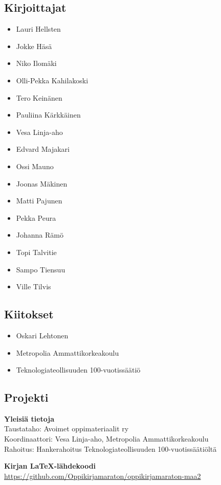 \newpage
\subsection*{Kirjoittajat}
\begin{itemize}
\item Lauri Hellsten
\item Jokke Häsä
\item Niko Ilomäki
\item Olli-Pekka Kahilakoski
\item Tero Keinänen
\item Pauliina Kärkkäinen
\item Vesa Linja-aho
\item Edvard Majakari
\item Ossi Mauno
\item Joonas Mäkinen
\item Matti Pajunen
\item Pekka Peura
\item Johanna Rämö
\item Topi Talvitie
\item Sampo Tiensuu
\item Ville Tilvis
\end{itemize}

\subsection*{Kiitokset}
\begin{itemize}
\item Oskari Lehtonen %
\item Metropolia Ammattikorkeakoulu %
\item Teknologiateollisuuden 100-vuotissäätiö %
\end{itemize}



\newpage
\subsection*{Projekti}

\textbf{Yleisiä tietoja} \\
Taustataho: Avoimet oppimateriaalit ry \\
Koordinaattori: Vesa Linja-aho, Metropolia Ammattikorkeakoulu \\
Rahoitus: Hankerahoitus Teknologiateollisuuden 100-vuotissäätiöltä

\textbf{Kirjan LaTeX-lähdekoodi} \\
\url{https://github.com/Oppikirjamaraton/oppikirjamaraton-maa2}

